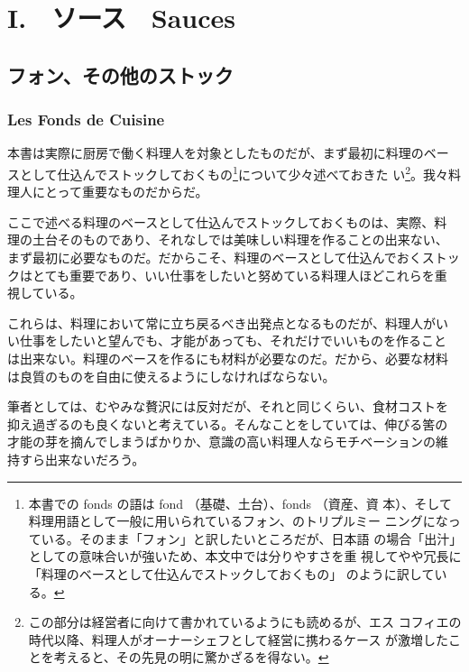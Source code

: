 \hypertarget{chapitreunsauces}{%
\chapter{I.　ソース　Sauces}\label{chapitreunsauces}}

\hypertarget{lesfondsdecuisine}{%
\section{フォン、その他のストック}\label{lesfondsdecuisine}}

\hypertarget{les-fonds-de-cuisine}{%
\subsection{Les Fonds de Cuisine}\label{les-fonds-de-cuisine}}

 

本書は実際に厨房で働く料理人を対象としたものだが、まず最初に料理のベー
スとして仕込んでストックしておくもの\footnote{本書での fonds の語は fond
  （基礎、土台）、fonds （資産、資
  本）、そして料理用語として一般に用いられているフォン、のトリプルミー
  ニングになっている。そのまま「フォン」と訳したいところだが、日本語
  の場合「出汁」としての意味合いが強いため、本文中では分りやすさを重
  視してやや冗長に「料理のベースとして仕込んでストックしておくもの」
  のように訳している。}について少々述べておきた い\footnote{この部分は経営者に向けて書かれているようにも読めるが、エス
  コフィエの時代以降、料理人がオーナーシェフとして経営に携わるケース
  が激増したことを考えると、その先見の明に驚かざるを得ない。}。我々料理人にとって重要なものだからだ。

ここで述べる料理のベースとして仕込んでストックしておくものは、実際、料
理の土台そのものであり、それなしでは美味しい料理を作ることの出来ない、
まず最初に必要なものだ。だからこそ、料理のベースとして仕込んでおくストッ
クはとても重要であり、いい仕事をしたいと努めている料理人ほどこれらを重
視している。

これらは、料理において常に立ち戻るべき出発点となるものだが、料理人がい
い仕事をしたいと望んでも、才能があっても、それだけでいいものを作ること
は出来ない。料理のベースを作るにも材料が必要なのだ。だから、必要な材料
は良質のものを自由に使えるようにしなければならない。

筆者としては、むやみな贅沢には反対だが、それと同じくらい、食材コストを
抑え過ぎるのも良くないと考えている。そんなことをしていては、伸びる筈の
才能の芽を摘んでしまうばかりか、意識の高い料理人ならモチベーションの維
持すら出来ないだろう。

